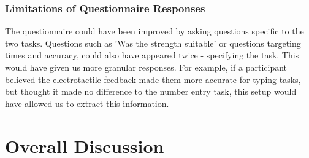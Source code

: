 \documentclass{mpaper}
\begin{document}
\subsubsection{Limitations of Questionnaire Responses}
The questionnaire could have been improved by asking questions specific to the two tasks. Questions such as 'Was the strength suitable' or questions targeting times and accuracy, could also have appeared twice - specifying the task. This would have given us more granular responses. For example, if a participant believed the electrotactile feedback made them more accurate for typing tasks, but thought it made no difference to the number entry task, this setup would have allowed us to extract this information. 


\section{Overall Discussion} \label{overall-discussion}
\end{document}
